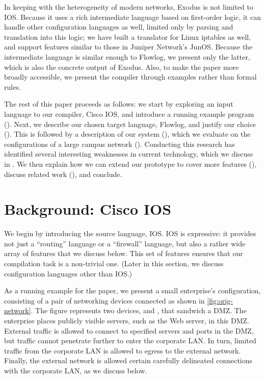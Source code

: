 In keeping with the heterogeneity of modern networks,
Exodus is not limited to IOS. Because it uses a rich intermediate
language based on first-order logic, it can handle other configuration
languages as well, limited only by parsing and translation into this
logic; we have built a translator for Linux iptables as well, and
support features similar to those in Juniper Network's JunOS. Because
the intermediate language is similar enough to Flowlog, we present
only the latter, which is also the concrete output of Exodus. Also, to
make the paper more broadly accessible, we present the compiler
through examples rather than formal rules.

The rest of this paper proceeds as follows: we start by exploring an
input language to our compiler, Cisco IOS, and introduce a running
example program ().  Next, we describe our chosen
target language, Flowlog, and justify our choice
(). This is followed by a description
of our system (), which we
evaluate on the configurations of a large campus network
().  Conducting this research has identified
several interesting weaknesses in current technology, which we discuss
in . We then explain how we can extend our
prototype to cover more features (), discuss
related work (), and conclude.

\section{Background: Cisco IOS}
\label{s:bg:ios}

We begin by introducing the source language, IOS. IOS is expressive:
it provides not just a ``routing'' language or a ``firewall'' language, but
also a rather wide array of features that we discuss
below. This set of features ensures that our compilation
task is a non-trivial one. (Later in this section, 
we discuss configuration languages other than IOS.)

As a running example for the paper, we present a small enterprise's
configuration, consisting of a pair of networking devices connected as
shown in \autoref{fig:orig-network}. The figure represents two
devices,  and , that sandwich a DMZ. The enterprise
places publicly visible servers, such as the Web server, in this
DMZ. External traffic is allowed to connect to specified servers and
ports in the DMZ, but traffic cannot penetrate further to enter the
corporate LAN. In turn, limited traffic from the corporate LAN is
allowed to egress to the external network. Finally, the external
network is allowed certain carefully delineated
connections with the corporate LAN, as we discuss below.

